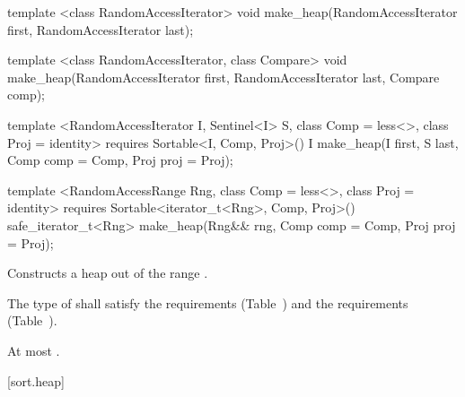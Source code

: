 %
\begin{removedblock}
\begin{itemdecl}
template <class RandomAccessIterator>
  void make_heap(RandomAccessIterator first, RandomAccessIterator last);

template <class RandomAccessIterator, class Compare>
  void make_heap(RandomAccessIterator first, RandomAccessIterator last,
                 Compare comp);
\end{itemdecl}
\end{removedblock}
\begin{addedblock}
\begin{itemdecl}
template <RandomAccessIterator I, Sentinel<I> S, class Comp = less<>,
    class Proj = identity>
  requires Sortable<I, Comp, Proj>()
  I make_heap(I first, S last, Comp comp = Comp{}, Proj proj = Proj{});

template <RandomAccessRange Rng, class Comp = less<>, class Proj = identity>
  requires Sortable<iterator_t<Rng>, Comp, Proj>()
  safe_iterator_t<Rng>
    make_heap(Rng&& rng, Comp comp = Comp{}, Proj proj = Proj{});
\end{itemdecl}
\end{addedblock}

\begin{itemdescr}
\pnum
\effects
Constructs a heap out of the range
.

\begin{removedblock}
\pnum
\requires The type of  shall satisfy
the  requirements
(Table~) and the
 requirements
(Table~).
\end{removedblock}

\begin{addedblock}
\pnum
\returns {}
\end{addedblock}

\pnum
\complexity
At most
.
\end{itemdescr}

[sort.heap]{}

